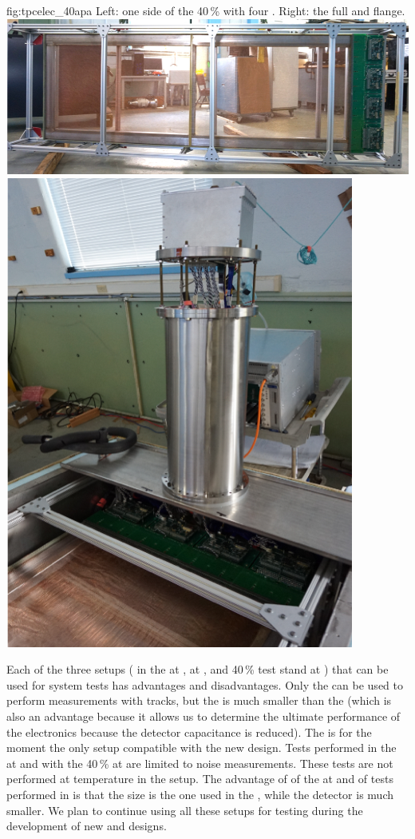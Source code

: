 \begin{dunefigure}
{fig:tpcelec_40apa}
{Left: one side of the \num{40}\,\%  with four .  Right: the full  \fdth and flange.}
\includegraphics[width=0.72\linewidth]{graphics/sp-tpcelec-40-apa.png}
\hspace{3mm}
\includegraphics[width=0.2\linewidth]{graphics/sp-tpcelec-40-apa-ft.png}
\end{dunefigure}

Each of the three setups ( in the \coldbox at ,   at ,
and \num{40}\,\%  test stand at ) that can be used for system tests has advantages
and disadvantages. Only the   can be used to 
perform measurements with tracks, but the  is 
much smaller than the    (which is also an advantage because it
allows us to determine the ultimate performance of the electronics because
the detector capacitance is reduced). The  
is for the moment the only setup compatible with the new 
design. Tests performed in the \coldbox at  and with the \num{40}\,\%  
at  are limited to noise measurements. These tests are not
performed at  temperature in the  setup. The advantage of
of the \coldbox at  and of tests performed in 
is that the  size is the one used in the  ,
while the  detector is much smaller. We plan to continue
using all these setups for testing during the development of 
new  and  designs.

